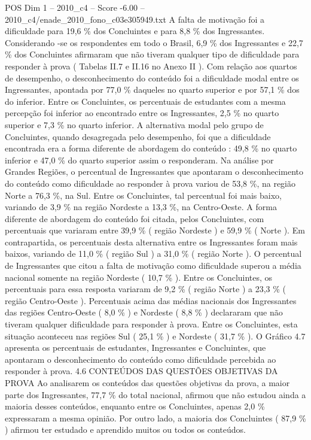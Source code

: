 \begin{textsample}{POS Dim 1 – 2010\_c4 – Score -6.00 – 2010\_c4/enade\_2010\_fono\_c03e305949.txt}
A falta de motivação foi a dificuldade para 19,6 \% dos Concluintes e para 8,8 \% dos Ingressantes.
Considerando -se os respondentes em todo o Brasil, 6,9 \% dos Ingressantes e 22,7 \% dos Concluintes afirmaram que não tiveram qualquer tipo de dificuldade para responder à prova ( Tabelas II.7 e II.16 no Anexo II ).
Com relação aos quartos de desempenho, o desconhecimento do conteúdo foi a dificuldade modal entre os Ingressantes, apontada por 77,0 \% daqueles no quarto superior e por 57,1 \% dos do inferior.
Entre os Concluintes, os percentuais de estudantes com a mesma percepção foi inferior ao encontrado entre os Ingressantes, 2,5 \% no quarto superior e 7,3 \% no quarto inferior.
A alternativa modal pelo grupo de Concluintes, quando desagregada pelo desempenho, foi que a dificuldade encontrada era a forma diferente de abordagem do conteúdo : 49,8 \% no quarto inferior e 47,0 \% do quarto superior assim o responderam.
Na análise por Grandes Regiões, o percentual de Ingressantes que apontaram o desconhecimento do conteúdo como dificuldade ao responder à prova variou de 53,8 \%, na região Norte a 76,3 \%, na Sul.
Entre os Concluintes, tal percentual foi mais baixo, variando de 3,9 \% na região Nordeste a 13,3 \%, na Centro-Oeste.
A forma diferente de abordagem do conteúdo foi citada, pelos Concluintes, com percentuais que variaram entre 39,9 \% ( região Nordeste ) e 59,9 \% ( Norte ).
Em contrapartida, os percentuais desta alternativa entre os Ingressantes foram mais baixos, variando de 11,0 \% ( região Sul ) a 31,0 \% ( região Norte ).
O percentual de Ingressantes que citou a falta de motivação como dificuldade superou a média nacional somente na região Nordeste ( 10,7 \% ).
Entre os Concluintes, os percentuais para essa resposta variaram de 9,2 \% ( região Norte ) a 23,3 \% ( região Centro-Oeste ).
Percentuais acima das médias nacionais dos Ingressantes das regiões Centro-Oeste ( 8,0 \% ) e Nordeste ( 8,8 \% ) declararam que não tiveram qualquer dificuldade para responder à prova.
Entre os Concluintes, esta situação aconteceu nas regiões Sul ( 25,1 \% ) e Nordeste ( 31,7 \% ).
O Gráfico 4.7 apresenta os percentuais de estudantes, Ingressantes e Concluintes, que apontaram o desconhecimento do conteúdo como dificuldade percebida ao responder à prova. 4.6 CONTEÚDOS DAS QUESTÕES OBJETIVAS DA PROVA Ao analisarem os conteúdos das questões objetivas da prova, a maior parte dos Ingressantes, 77,7 \% do total nacional, afirmou que não estudou ainda a maioria desses conteúdos, enquanto entre os Concluintes, apenas 2,0 \% expressaram a mesma opinião.
Por outro lado, a maioria dos Concluintes ( 87,9 \% ) afirmou ter estudado e aprendido muitos ou todos os conteúdos.

\end{textsample}
